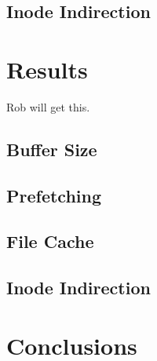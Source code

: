 \documentclass[letterpaper,twocolumn,10pt]{article}
\begin{document}
\subsection{Inode Indirection}


\section{Results}
Rob will get this.
\subsection{Buffer Size}
\subsection{Prefetching}
\subsection{File Cache}
\subsection{Inode Indirection}

\section{Conclusions}

{\footnotesize 
}

\theendnotes
\end{document}
